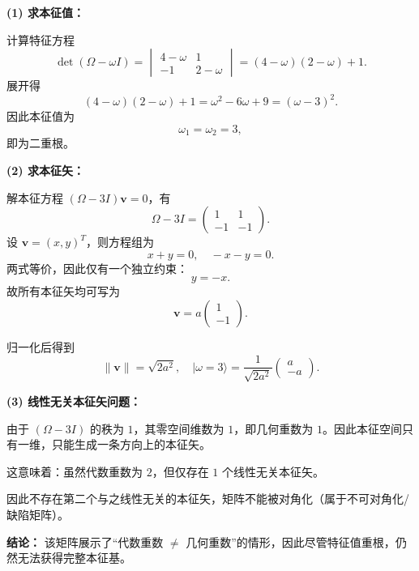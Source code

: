 \begin{solution}[矩阵特征值退化与不可对角化示例]
\answer

\textbf{(1) 求本征值：}

计算特征方程
\[
\det(\Omega-\omega I)=
\begin{vmatrix}
4-\omega & 1\\
-1 & 2-\omega
\end{vmatrix}
=(4-\omega)(2-\omega)+1.
\]
展开得
\[
(4-\omega)(2-\omega)+1=\omega^2-6\omega+9=(\omega-3)^2.
\]
因此本征值为
\[
\omega_1=\omega_2=3,
\]
即为二重根。

\vspace{0.5em}
\textbf{(2) 求本征矢：}

解本征方程 $(\Omega-3I)\mathbf{v}=0$，有
\[
\Omega-3I=
\begin{pmatrix}
1&1\\
-1&-1
\end{pmatrix}.
\]
设 $\mathbf{v}=(x,y)^T$，则方程组为
\[
x+y=0,\quad -x-y=0.
\]
两式等价，因此仅有一个独立约束：
\[
y=-x.
\]
故所有本征矢均可写为
\[
\mathbf{v}=a\begin{pmatrix}1\\-1\end{pmatrix}.
\]

归一化后得到
\[
\|\mathbf{v}\|=\sqrt{2a^2},
\quad
|\omega=3\rangle=\frac{1}{\sqrt{2a^2}}
\begin{pmatrix}
a\\
-a
\end{pmatrix}.
\]

\vspace{0.5em}
\textbf{(3) 线性无关本征矢问题：}

由于 $(\Omega-3I)$ 的秩为 $1$，其零空间维数为 $1$，即几何重数为 $1$。因此本征空间只有一维，只能生成一条方向上的本征矢。

这意味着：虽然代数重数为 $2$，但仅存在 $1$ 个线性无关本征矢。

因此不存在第二个与之线性无关的本征矢，矩阵不能被对角化（属于不可对角化/缺陷矩阵）。

\vspace{0.5em}
\textbf{结论：}
该矩阵展示了“代数重数 $\neq$ 几何重数”的情形，因此尽管特征值重根，仍然无法获得完整本征基。
\end{solution}


